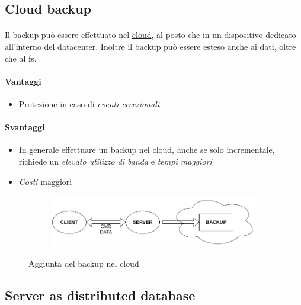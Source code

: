 \documentclass{article}
\begin{document}
\subsection{Cloud backup}

\paragraph{} Il backup può essere effettuato nel \underline{cloud}, al posto che in un dispositivo dedicato all'interno del datacenter. Inoltre il backup può essere esteso anche ai dati, oltre che al fs. 

\paragraph{Vantaggi} \begin{itemize}
	\item Protezione in caso di \emph{eventi eccezionali}
\end{itemize}

\paragraph{Svantaggi} \begin{itemize}
	\item In generale effettuare un backup nel cloud, anche se solo incrementale, richiede un \emph{elevato utilizzo di banda} e \emph{tempi maggiori} 
	\item \emph{Costi} maggiori 
\end{itemize}

\begin{figure}[H]
	\centering
	\begin{subfigure}{0.80\linewidth}
		\includegraphics[width=\linewidth]{../diagrams/architettura/3.png}
	\end{subfigure}
	\caption{Aggiunta del backup nel cloud}
\end{figure}



\subsection{Server as distributed database}
\end{document}
